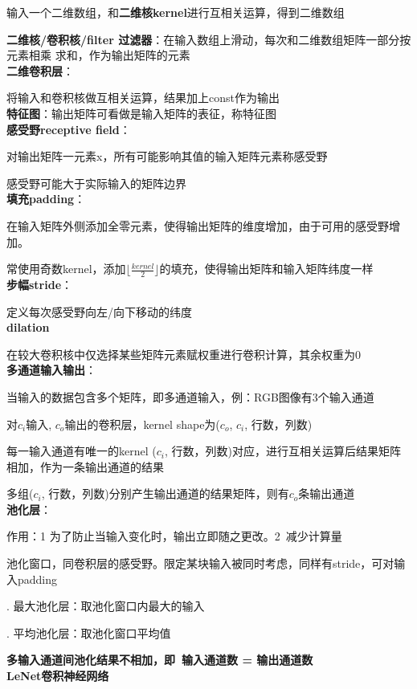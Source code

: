 \documentclass[UTF8]{ctexart}
\begin{document}
  输入一个二维数组，和\textbf{二维核kernel}进行互相关运算，得到二维数组

  \textbf{二维核/卷积核/filter 过滤器}：在输入数组上滑动，每次和二维数组矩阵一部分按元素相乘 求和，作为输出矩阵的元素\\
\textbf{二维卷积层}：

  将输入和卷积核做互相关运算，结果加上const作为输出\\
\textbf{特征图}：输出矩阵可看做是输入矩阵的表征，称特征图\\
\textbf{感受野receptive field}：
  
  对输出矩阵一元素x，所有可能影响其值的输入矩阵元素称感受野

  感受野可能大于实际输入的矩阵边界\\
\textbf{填充padding}：
  
  在输入矩阵外侧添加全零元素，使得输出矩阵的维度增加，由于可用的感受野增加。

  常使用奇数kernel，添加$\lfloor \frac{kernel}{2}\rfloor $的填充，使得输出矩阵和输入矩阵纬度一样\\
\textbf{步幅stride}：

  定义每次感受野向左/向下移动的纬度\\
\textbf{dilation}

  在较大卷积核中仅选择某些矩阵元素赋权重进行卷积计算，其余权重为0\\
\textbf{多通道输入输出}：

  当输入的数据包含多个矩阵，即多通道输入，例：RGB图像有3个输入通道

  对$c_i$输入, $c_o$输出的卷积层，kernel shape为($c_o$, $c_i$, 行数，列数)

  \quad 每一输入通道有唯一的kernel ($c_i$, 行数，列数)对应，进行互相关运算后结果矩阵相加，作为一条输出通道的结果

  \quad 多组($c_i$, 行数，列数)分别产生输出通道的结果矩阵，则有$c_o$条输出通道\\
\textbf{池化层}：
  
  作用：1 为了防止当输入变化时，输出立即随之更改。2\ 减少计算量

  池化窗口，同卷积层的感受野。限定某块输入被同时考虑，同样有stride，可对输入padding

  . 最大池化层：取池化窗口内最大的输入

  . 平均池化层：取池化窗口平均值

  \textbf{多输入通道间池化结果不相加，即\ 输入通道数 = 输出通道数}\\
\textbf{LeNet卷积神经网络}
\end{document}

